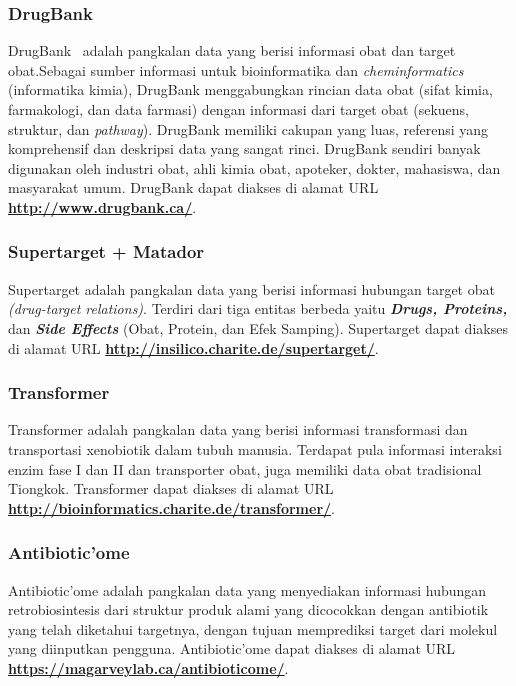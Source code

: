 		\subsubsection{DrugBank} \label{drugbank}
		DrugBank~\cite{pmid21059682} adalah pangkalan data yang berisi informasi obat dan target obat.Sebagai sumber informasi untuk bioinformatika dan \emph{cheminformatics} (informatika kimia), DrugBank menggabungkan rincian data obat (sifat kimia, farmakologi, dan data farmasi) dengan informasi dari target obat (sekuens, struktur, dan \emph{pathway}). DrugBank memiliki cakupan yang luas, referensi yang komprehensif dan deskripsi data yang sangat rinci. DrugBank sendiri banyak digunakan oleh industri obat, ahli kimia obat, apoteker, dokter, mahasiswa, dan masyarakat umum. DrugBank dapat diakses di alamat URL \textbf{\url{http://www.drugbank.ca/}}.

		\subsubsection{Supertarget + Matador} \label{supertarget}
		Supertarget adalah pangkalan data yang berisi informasi hubungan target obat \emph{(drug-target relations)}. Terdiri dari tiga entitas berbeda yaitu \textbf{\emph{Drugs, Proteins,}} dan \textbf{\emph{Side Effects}} (Obat, Protein, dan Efek Samping). Supertarget dapat diakses di alamat URL \textbf{\url{http://insilico.charite.de/supertarget/}}.

		\subsubsection{Transformer} \label{transformer}
		Transformer adalah pangkalan data yang berisi informasi transformasi dan transportasi xenobiotik dalam tubuh manusia. Terdapat pula informasi interaksi enzim fase I dan II dan transporter obat, juga memiliki data obat tradisional Tiongkok. Transformer dapat diakses di alamat URL \textbf{\url{http://bioinformatics.charite.de/transformer/}}.

		\subsubsection{Antibiotic'ome} \label{antibioticome}
		Antibiotic'ome adalah pangkalan data yang menyediakan informasi hubungan retrobiosintesis dari struktur produk alami yang dicocokkan dengan antibiotik yang telah diketahui targetnya, dengan tujuan memprediksi target dari molekul yang diinputkan pengguna. Antibiotic'ome dapat diakses di alamat URL \textbf{\url{https://magarveylab.ca/antibioticome/}}.

